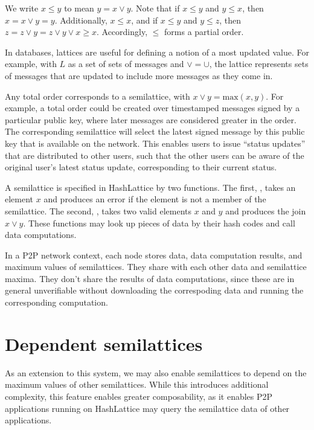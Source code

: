 \documentclass{article}
\begin{document}
    We write $x \leq y$ to mean $y = x \vee y$. Note that if $x \leq y$ and $y \leq x$, then $x = x \vee y = y$. Additionally, $x \leq x$, and if $x \leq y$ and $y \leq z$, then $z = z \vee y = z \vee y \vee x \geq x$. Accordingly, $\leq$ forms a partial order.

    In databases, lattices are useful for defining a notion of a most updated value. For example, with $L$ as a set of sets of messages and $\vee = \cup$, the lattice represents sets of messages that are updated to include more messages as they come in.

    Any total order corresponds to a semilattice, with $x \vee y = \mathrm{max}(x, y)$. For example, a total order could be created over timestamped messages signed by a particular public key, where later messages are considered greater in the order. The corresponding semilattice will select the latest signed message by this public key that is available on the network. This enables users to issue ``status updates'' that are distributed to other users, such that the other users can be aware of the original user's latest status update, corresponding to their current status.


    A semilattice is specified in HashLattice by two functions. The first, \checkelem, takes an element $x$ and produces an error if the element is not a member of the semilattice. The second, \join, takes two valid elements $x$ and $y$ and produces the join $x \vee y$. These functions may look up pieces of data by their hash codes and call data computations.

    In a P2P network context, each node stores data, data computation results, and maximum values of semilattices. They share with each other data and semilattice maxima. They don't share the results of data computations, since these are in general unverifiable without downloading the correspoding data and running the corresponding computation.

  \section{Dependent semilattices}

    As an extension to this system, we may also enable semilattices to depend on the maximum values of other semilattices. While this introduces additional complexity, this feature enables greater composability, as it enables P2P applications running on HashLattice may query the semilattice data of other applications.
\end{document}
